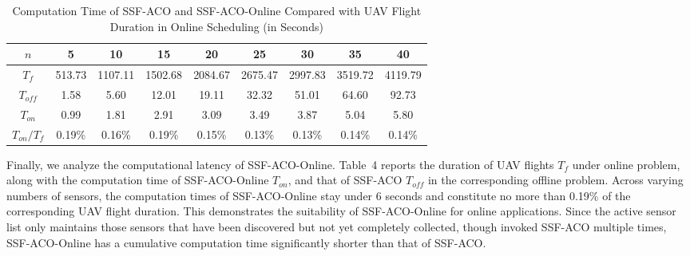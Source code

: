 \begin{revresponse}
	\begin{table}[h]
		\renewcommand{\arraystretch}{1.2}
		\centering
		\caption{Computation Time of SSF-ACO and SSF-ACO-Online Compared with UAV Flight Duration in Online Scheduling (in Seconds)}
		\label{tb:runtime2}
		\centering
		\begin{tabular}{*{9}{c}}
			\hline
			$n$ & 5 & 10 & 15 & 20 & 25 & 30 & 35 & 40 \\
			\hline
			$T_f$ & 513.73 & 1107.11 & 1502.68 & 2084.67 & 2675.47 & 2997.83 & 3519.72 & 4119.79 \\
			$T_{off}$ & 1.58 & 5.60 & 12.01 & 19.11 & 32.32 & 51.01 & 64.60 & 92.73 \\
			$T_{on}$ & 0.99 & 1.81 & 2.91 & 3.09 & 3.49 & 3.87 & 5.04 & 5.80 \\
			$T_{on} / T_f$ & 0.19\% & 0.16\% & 0.19\% & 0.15\% & 0.13\% & 0.13\% & 0.14\% & 0.14\% \\
			\hline
		\end{tabular}
	\end{table}

	\begin{changes}
		Finally, we analyze the computational latency of SSF-ACO-Online.
		Table~4 reports the duration of UAV flights $T_f$ under online problem, along with the computation time of SSF-ACO-Online $T_{on}$, and that of SSF-ACO $T_{off}$ in the corresponding offline problem.
		Across varying numbers of sensors, the computation times of SSF-ACO-Online stay under 6 seconds and constitute no more than 0.19\% of the corresponding UAV flight duration.
		This demonstrates the suitability of SSF-ACO-Online for online applications.
		Since the active sensor list only maintains those sensors that have been discovered but not yet completely collected, though invoked SSF-ACO multiple times, SSF-ACO-Online has a cumulative computation time significantly shorter than that of SSF-ACO.
	\end{changes}
\end{revresponse}

